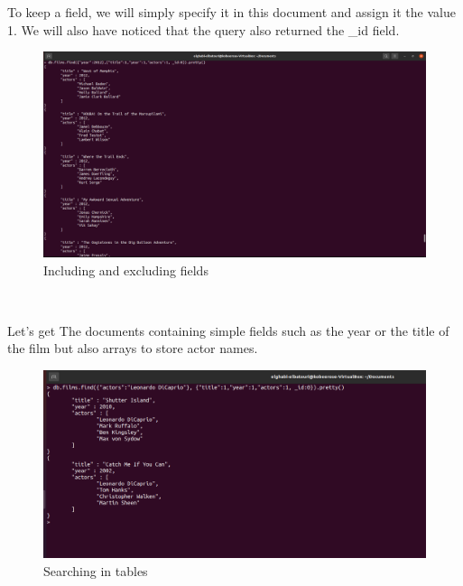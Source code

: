 \begin{spacing}{0.9}
\par To keep a field, we will simply specify it in this document and assign it the value 1.
We will also have noticed that the query also returned the \_id field. 
\\
\begin{figure}[!htb] 
\begin{center} 
\includegraphics[width=1\linewidth]{Pictures/MongoDB/Examining MongoDB Query Features/Document search/Including and excluding fields} 
\end{center} 
\caption{Including and excluding fields} 
\end{figure}  \FloatBarrier
\\
\newpage
\par Let's get The documents containing simple fields such as the year or the title of the film but also
arrays to store actor names.
\\
\begin{figure}[!htb] 
\begin{center} 
\includegraphics[width=1\linewidth]{Pictures/MongoDB/Examining MongoDB Query Features/Document search/Searching in tables} 
\end{center} 
\caption{Searching in tables} 
\end{figure}  \FloatBarrier
\\


\end{spacing}
